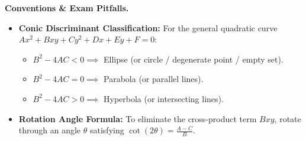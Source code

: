 \documentclass{natsirt}
\newenvironment{warningbox}[1][]{\begin{whitebox}[#1]\textbf{Conventions \& Exam Pitfalls. }}{\end{whitebox}}
\newcommand{\citem}{\item[$\square$]}
\begin{document}
\begin{warningbox}
    \begin{itemize}
        \citem \textbf{Conic Discriminant Classification:} For the general quadratic curve $Ax^2 + Bxy + Cy^2 + Dx + Ey + F = 0$:
        \begin{itemize}
            \item $B^2 - 4AC < 0 \implies$ Ellipse (or circle / degenerate point / empty set).
            \item $B^2 - 4AC = 0 \implies$ Parabola (or parallel lines).
            \item $B^2 - 4AC > 0 \implies$ Hyperbola (or intersecting lines).
        \end{itemize}
        \citem \textbf{Rotation Angle Formula:} To eliminate the cross-product term $Bxy$, rotate through an angle $\theta$ satisfying $\cot(2\theta) = \frac{A - C}{B}$.
    \end{itemize}
\end{warningbox}
\end{document}
